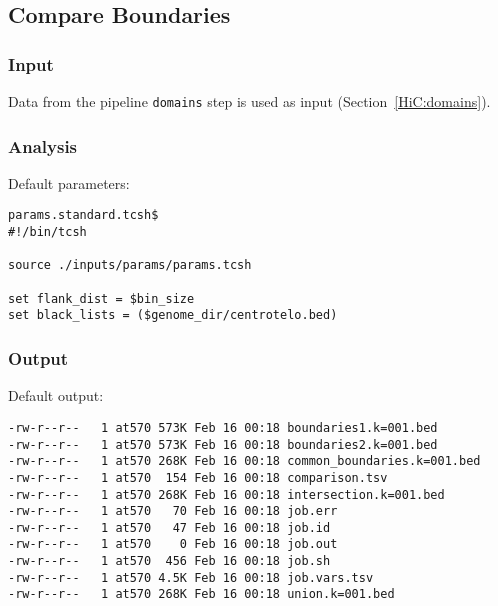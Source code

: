 \subsection{Compare Boundaries}\label{HiC:compare-boundaries}%
\subsubsection{Input} %
Data from the pipeline \texttt{domains} step is used as input (Section~\ref{HiC:domains}).

\subsubsection{Analysis} %
Default parameters:
\begin{lstlisting}
params.standard.tcsh$
#!/bin/tcsh

source ./inputs/params/params.tcsh

set flank_dist = $bin_size
set black_lists = ($genome_dir/centrotelo.bed)
\end{lstlisting}
\subsubsection{Output} %
Default output: %
\begin{lstlisting}
-rw-r--r--   1 at570 573K Feb 16 00:18 boundaries1.k=001.bed
-rw-r--r--   1 at570 573K Feb 16 00:18 boundaries2.k=001.bed
-rw-r--r--   1 at570 268K Feb 16 00:18 common_boundaries.k=001.bed
-rw-r--r--   1 at570  154 Feb 16 00:18 comparison.tsv
-rw-r--r--   1 at570 268K Feb 16 00:18 intersection.k=001.bed
-rw-r--r--   1 at570   70 Feb 16 00:18 job.err
-rw-r--r--   1 at570   47 Feb 16 00:18 job.id
-rw-r--r--   1 at570    0 Feb 16 00:18 job.out
-rw-r--r--   1 at570  456 Feb 16 00:18 job.sh
-rw-r--r--   1 at570 4.5K Feb 16 00:18 job.vars.tsv
-rw-r--r--   1 at570 268K Feb 16 00:18 union.k=001.bed
\end{lstlisting}
% 
\clearpage